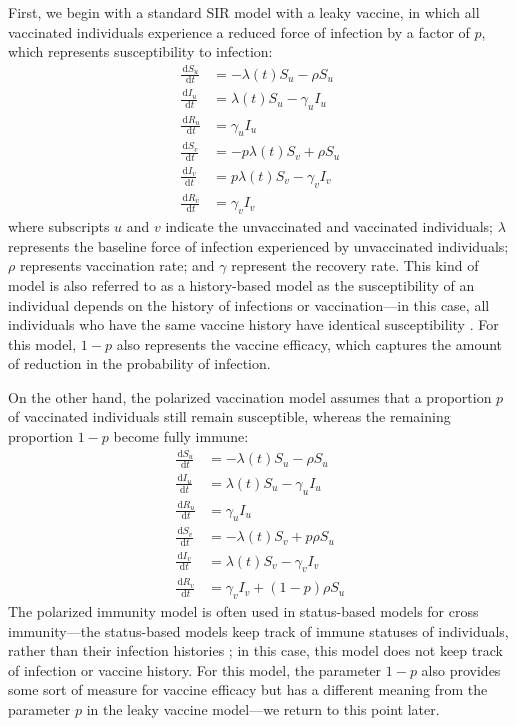 \documentclass[12pt]{article}
\newcommand{\dd}[1]{\ensuremath{\, \mathrm{d}#1}}
\begin{document}
First, we begin with a standard SIR model with a leaky vaccine, in which all vaccinated individuals experience a reduced force of infection by a factor of $p$, which represents susceptibility to infection:
\begin{align}
\frac{\dd S_u}{\dd t} &= - \lambda(t) S_u - \rho S_u \\
\frac{\dd I_u}{\dd t} &= \lambda(t) S_u - \gamma_u I_u \\
\frac{\dd R_u}{\dd t} &= \gamma_u I_u \\
\frac{\dd S_v}{\dd t} &= - p \lambda(t) S_v + \rho S_u \\
\frac{\dd I_v}{\dd t} &= p \lambda(t) S_v - \gamma_v I_v \\
\frac{\dd R_v}{\dd t} &= \gamma_v I_v
\end{align}
where subscripts $u$ and $v$ indicate the unvaccinated and vaccinated individuals;
$\lambda$ represents the baseline force of infection experienced by unvaccinated individuals; 
$\rho$ represents vaccination rate;
and $\gamma$ represent the recovery rate.
This kind of model is also referred to as a history-based model as the susceptibility of an individual depends on the history of infections or vaccination---in this case, all individuals who have the same vaccine history have identical susceptibility \citep{gog2002dynamics,gog2002status,kucharski2016capturing}.
For this model, $1-p$ also represents the vaccine efficacy, which captures the amount of reduction in the probability of infection.

On the other hand, the polarized vaccination model assumes that a proportion $p$ of vaccinated individuals still remain susceptible, whereas the remaining proportion $1-p$ become fully immune: 
\begin{align}
\frac{\dd S_u}{\dd t} &= - \lambda(t) S_u - \rho S_u \\
\frac{\dd I_u}{\dd t} &= \lambda(t) S_u - \gamma_u I_u \\
\frac{\dd R_u}{\dd t} &= \gamma_u I_u \\
\frac{\dd S_v}{\dd t} &= - \lambda(t) S_v + p \rho S_u \\
\frac{\dd I_v}{\dd t} &= \lambda(t) S_v - \gamma_v I_v \\
\frac{\dd R_v}{\dd t} &= \gamma_v I_v + (1-p) \rho S_u
\end{align}
The polarized immunity model is often used in status-based models for cross immunity---the status-based models keep track of immune statuses of individuals, rather than their infection histories \citep{gog2002dynamics,gog2002status,kucharski2016capturing};
in this case, this model does not keep track of infection or vaccine history.
For this model, the parameter $1-p$ also provides some sort of measure for vaccine efficacy but has a different meaning from the parameter $p$ in the leaky vaccine model---we return to this point later.
\end{document}
